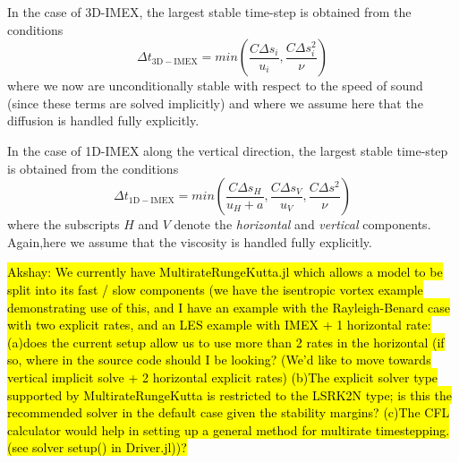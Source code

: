 \documentclass{report}
\begin{document}
In the case of 3D-IMEX, the largest stable time-step is obtained from the conditions
\[
\Delta t_{\mathrm{3D-IMEX}} = min \left( \frac{C \Delta s_i}{u_i}, \frac{C \Delta s_i^2}{\nu} \right)
\]
where we now are unconditionally stable with respect to the speed of sound (since these terms are solved implicitly) and where we assume here that the diffusion is handled fully explicitly.

In the case of 1D-IMEX along the vertical direction, the largest stable time-step is obtained from the conditions
\[
\Delta t_{\mathrm{1D-IMEX}} = min \left( \frac{C \Delta s_H}{u_H+a}, \frac{C \Delta s_V}{u_V}, \frac{C \Delta s^2}{\nu} \right)
\]
where the subscripts $H$ and $V$ denote the \emph{horizontal} and \emph{vertical} components. Again,here we assume that the viscosity is handled fully explicitly.

\hl{Akshay: We currently have MultirateRungeKutta.jl which allows a model to be split into its fast / slow components (we have the isentropic vortex example demonstrating use of this, and I have an example with the Rayleigh-Benard case with two explicit rates, and an LES example with IMEX + 1 horizontal rate: (a)does the current setup allow us to use more than 2 rates in the horizontal (if so, where in the source code should I be looking? (We'd like to move towards vertical implicit solve + 2 horizontal explicit rates) (b)The explicit solver type supported by MultirateRungeKutta is restricted to the LSRK2N type; is this the recommended solver in the default case given the stability margins? (c)The CFL calculator would help in setting up a general method for multirate timestepping. (see solver setup() in Driver.jl))?}


\end{document}
